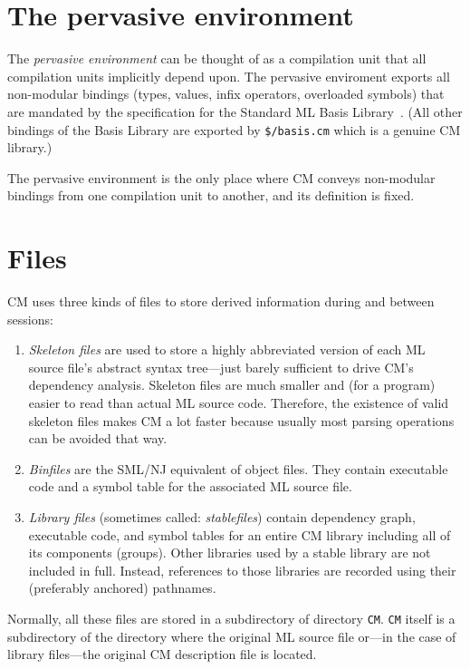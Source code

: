 \documentclass[titlepage,letterpaper]{article}
\begin{document}
\section{The pervasive environment}

The {\em pervasive environment} can be thought of as a compilation
unit that all compilation units implicitly depend upon.  The pervasive
enviroment exports all non-modular bindings (types, values, infix
operators, overloaded symbols) that are mandated by the specification
for the Standard ML Basis Library~\cite{reppy99:basis}.  (All other
bindings of the Basis Library are exported by {\tt \$/basis.cm} which is
a genuine CM library.)

The pervasive environment is the only place where CM conveys
non-modular bindings from one compilation unit to another, and its
definition is fixed.

\section{Files}
\label{sec:files}

CM uses three kinds of files to store derived information during and
between sessions:

\begin{enumerate}
\item {\it Skeleton files} are used to store a highly abbreviated
version of each ML source file's abstract syntax tree---just barely
sufficient to drive CM's dependency analysis.  Skeleton files are much
smaller and (for a program) easier to read than actual ML source code.
Therefore, the existence of valid skeleton files makes CM a lot faster
because usually most parsing operations can be avoided that way.
\item {\it Binfiles} are the SML/NJ equivalent of object files.  They
contain executable code and a symbol table for the associated ML
source file.
\item {\it Library files} (sometimes called: {\em stablefiles}) contain
dependency graph, executable code, and symbol tables for an entire CM
library including all of its components (groups).  Other libraries
used by a stable library are not included in full.  Instead,
references to those libraries are recorded using their (preferably
anchored) pathnames.
\end{enumerate}

Normally, all these files are stored in a subdirectory of directory
{\tt CM}. {\tt CM} itself is a subdirectory of the directory where the
original ML source file or---in the case of library files---the
original CM description file is located.
\end{document}
